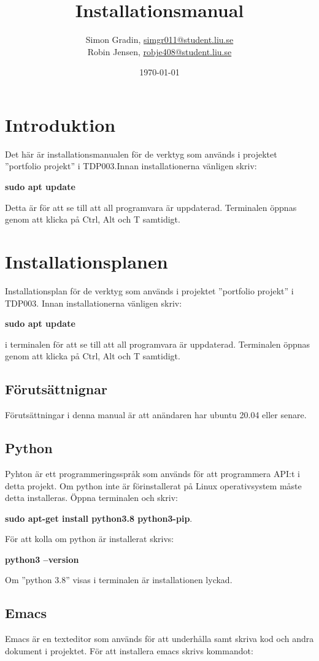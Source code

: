 \documentclass{TDP003mall}
\author{Simon Gradin, \url{simgr011@student.liu.se}\\
  Robin Jensen, \url{robje408@student.liu.se}}
\title{Installationsmanual}
\date{\today}
\begin{document}
\projectpage

\tableofcontents
\clearpage

\section{Introduktion}
Det här är installationsmanualen för de verktyg som används i projektet ''portfolio projekt'' i TDP003.Innan installationerna vänligen skriv:

\textbf{sudo apt update}

Detta är för att se till att all programvara är uppdaterad. Terminalen öppnas genom att klicka på Ctrl, Alt och T samtidigt.

\section{Installationsplanen}
Installationsplan för de verktyg som används i projektet ''portfolio projekt'' i TDP003. Innan installationerna vänligen skriv:

\textbf{sudo apt update}

i terminalen för att se till att all programvara är uppdaterad. Terminalen öppnas genom att klicka på Ctrl, Alt och T samtidigt.

\subsection{Förutsättnignar}
Förutsättningar i denna manual är att anändaren har ubuntu 20.04 eller senare.

\subsection{Python}
Pyhton är ett programmeringsspråk som används för att programmera API:t i detta projekt.
Om python inte är förinstallerat på Linux operativsystem måste detta installeras. Öppna terminalen och skriv:

\textbf{sudo apt-get install python3.8 python3-pip}.

För att kolla om python är installerat skrivs:

\textbf{python3 --version}

Om ''python 3.8'' visas i terminalen är installationen lyckad.

\subsection{Emacs}
Emacs är en texteditor som används för att underhålla samt skriva kod och andra dokument i projektet.
För att installera emacs skrivs kommandot:
\end{document}
